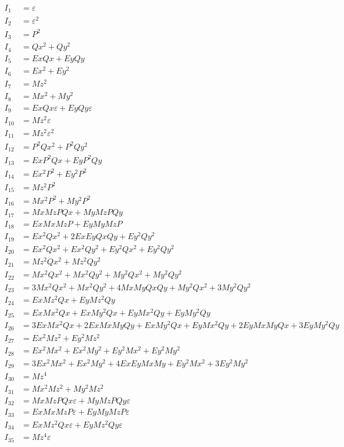 \documentclass{article}
\begin{document}
\begin{align*}
I_{1} &= ε \\
I_{2} &= ε^{2} \\
I_{3} &= P^{2} \\
I_{4} &= Qx^{2} + Qy^{2} \\
I_{5} &= Ex Qx + Ey Qy \\
I_{6} &= Ex^{2} + Ey^{2} \\
I_{7} &= Mz^{2} \\
I_{8} &= Mx^{2} + My^{2} \\
I_{9} &= Ex Qx ε + Ey Qy ε \\
I_{10} &= Mz^{2} ε \\
I_{11} &= Mz^{2} ε^{2} \\
I_{12} &= P^{2} Qx^{2} + P^{2} Qy^{2} \\
I_{13} &= Ex P^{2} Qx + Ey P^{2} Qy \\
I_{14} &= Ex^{2} P^{2} + Ey^{2} P^{2} \\
I_{15} &= Mz^{2} P^{2} \\
I_{16} &= Mx^{2} P^{2} + My^{2} P^{2} \\
I_{17} &= Mx Mz P Qx + My Mz P Qy \\
I_{18} &= Ex Mx Mz P + Ey My Mz P \\
I_{19} &= Ex^{2} Qx^{2} + 2 Ex Ey Qx Qy + Ey^{2} Qy^{2} \\
I_{20} &= Ex^{2} Qx^{2} + Ex^{2} Qy^{2} + Ey^{2} Qx^{2} + Ey^{2} Qy^{2} \\
I_{21} &= Mz^{2} Qx^{2} + Mz^{2} Qy^{2} \\
I_{22} &= Mx^{2} Qx^{2} + Mx^{2} Qy^{2} + My^{2} Qx^{2} + My^{2} Qy^{2} \\
I_{23} &= 3 Mx^{2} Qx^{2} + Mx^{2} Qy^{2} + 4 Mx My Qx Qy + My^{2} Qx^{2} + 3 My^{2} Qy^{2} \\
I_{24} &= Ex Mz^{2} Qx + Ey Mz^{2} Qy \\
I_{25} &= Ex Mx^{2} Qx + Ex My^{2} Qx + Ey Mx^{2} Qy + Ey My^{2} Qy \\
I_{26} &= 3 Ex Mx^{2} Qx + 2 Ex Mx My Qy + Ex My^{2} Qx + Ey Mx^{2} Qy + 2 Ey Mx My Qx + 3 Ey My^{2} Qy \\
I_{27} &= Ex^{2} Mz^{2} + Ey^{2} Mz^{2} \\
I_{28} &= Ex^{2} Mx^{2} + Ex^{2} My^{2} + Ey^{2} Mx^{2} + Ey^{2} My^{2} \\
I_{29} &= 3 Ex^{2} Mx^{2} + Ex^{2} My^{2} + 4 Ex Ey Mx My + Ey^{2} Mx^{2} + 3 Ey^{2} My^{2} \\
I_{30} &= Mz^{4} \\
I_{31} &= Mx^{2} Mz^{2} + My^{2} Mz^{2} \\
I_{32} &= Mx Mz P Qx ε + My Mz P Qy ε \\
I_{33} &= Ex Mx Mz P ε + Ey My Mz P ε \\
I_{34} &= Ex Mz^{2} Qx ε + Ey Mz^{2} Qy ε \\
I_{35} &= Mz^{4} ε \\
\end{align*}
\end{document}
